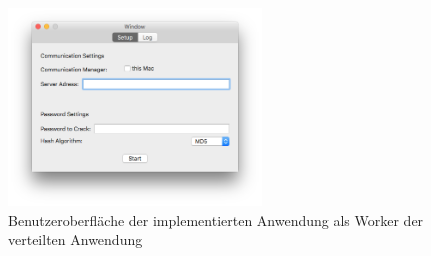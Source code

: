 \begin{figure}[!ht]
	\centering
		\includegraphics[natwidth=1200pt, natheight=349pt, width=0.6\textwidth]{images/WindowWorker.png}
		\caption{Benutzeroberfläche der implementierten Anwendung als Worker der verteilten Anwendung}
	\label{fig:WindowMaster}
\end{figure}


